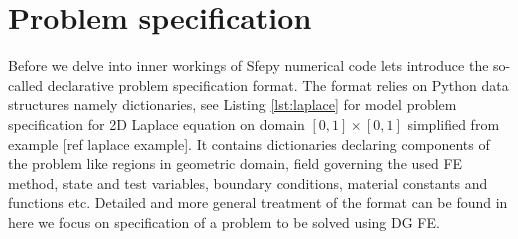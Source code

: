 \section{Problem specification}
Before we delve into inner workings of Sfepy numerical code lets introduce the so-called 
declarative problem specification format. The format relies on Python data structures 
namely dictionaries, see 
Listing \ref{lst:laplace} for model problem specification for 2D Laplace equation on 
domain $[0, 1] \times [0, 1]$ simplified from example [\todo ref laplace example]. It 
contains dictionaries declaring components of the problem like regions in geometric 
domain, field governing the used FE method, state and test variables, boundary 
conditions, material constants and functions etc. Detailed and more general treatment of 
the format can be found in \cite{Cimrman_Lukes_Rohan_2019} here we focus on specification 
of a problem to be solved using DG FE.

